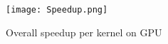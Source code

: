 \documentclass[14pt,fleqn]{article}
\begin{document}
\begin{figure}
\centering
    \texttt{[image: Speedup.png]}
    \caption{Overall speedup per kernel on GPU}
    \label{fig:Speedup}
\end{figure}




\end{document}
